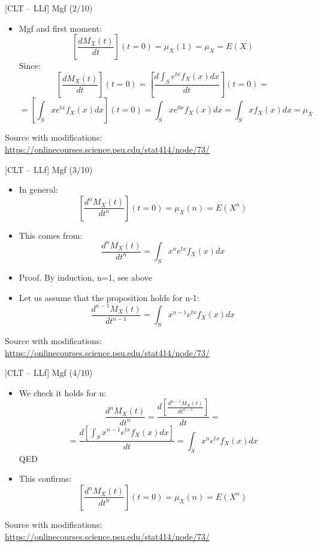 \documentclass{beamer}
\begin{document}
\begin{frame}
{\centerline{[CLT -- LLf] Mgf (2/10)}}

\begin{itemize}
\item Mgf and first moment:
$$ \left [ \frac{dM_X(t)}{dt} \right ] (t=0) = \mu_X(1) = \mu_X = E(X)$$
Since:
$$ \left [ \frac{dM_X(t)}{dt} \right ] (t=0) = \left [ \frac{d\int_S e^{tx}f_X(x)dx}{dt} \right ] (t=0) = $$
$$ = \left [ \int_S xe^{tx}f_X(x)dx \right ] (t=0) = \int_S xe^{0x}f_X(x)dx=  \int_S xf_X(x)dx = \mu_X$$

\end{itemize}

\begin{center}
\tiny 
Source with modifications: \url{https://onlinecourses.science.psu.edu/stat414/node/73/}
\end{center}
\end{frame}


\begin{frame}
{\centerline{[CLT -- LLf] Mgf (3/10)}}

\begin{itemize}
\item In general:
$$ \left [ \frac{d^nM_X(t)}{dt^n} \right ] (t=0)  = \mu_X(n) = E(X^n)$$
\item This comes from:
$$ \frac{d^nM_X(t)}{dt^n} =  \int_S x^ne^{tx}f_X(x)dx$$
\item Proof. By induction, n=1, see above
\item Let us assume that the proposition holds for n-1:
$$ \frac{d^{n-1}M_X(t)}{dt^{n-1}} =  \int_S x^{n-1}e^{tx}f_X(x)dx$$

\end{itemize}

\begin{center}
\tiny 
Source with modifications: \url{https://onlinecourses.science.psu.edu/stat414/node/73/}
\end{center}
\end{frame}


\begin{frame}
{\centerline{[CLT -- LLf] Mgf (4/10)}}

\begin{itemize}
\item We check it holds for n:
$$ \frac{d^nM_X(t)}{dt^n} =   \frac{d \left [  \frac{d^{n-1}M_X(t)}{dt^{n-1}} \right ]}{dt} = $$
$$  =   \frac{d \left [  \int_S x^{n-1}e^{tx}f_X(x)dx \right ]}{dt} = \int_S x^ne^{tx}f_X(x)dx $$
QED
\item This confirms:
$$ \left [ \frac{d^nM_X(t)}{dt^n} \right ] (t=0)  = \mu_X(n) = E(X^n)$$

\end{itemize}
\begin{center}
\tiny 
Source with modifications: \url{https://onlinecourses.science.psu.edu/stat414/node/73/}
\end{center}
\end{frame}
\end{document}
